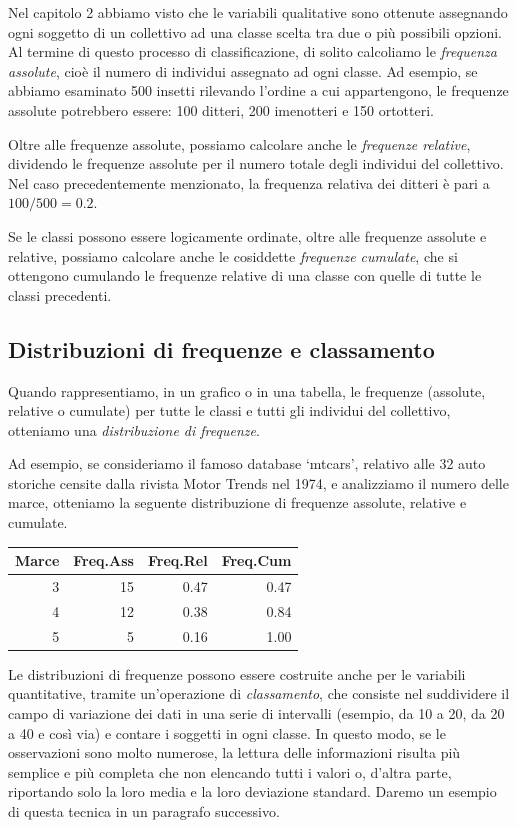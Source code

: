\documentclass[a4paper,12pt,oneside]{book}
\begin{document}
Nel capitolo 2 abbiamo visto che le variabili qualitative sono ottenute assegnando ogni soggetto di un collettivo ad una classe scelta tra due o più possibili opzioni. Al termine di questo processo di classificazione, di solito calcoliamo le \emph{frequenza assolute}, cioè il numero di individui assegnato ad ogni classe. Ad esempio, se abbiamo esaminato 500 insetti rilevando l'ordine a cui appartengono, le frequenze assolute potrebbero essere: 100 ditteri, 200 imenotteri e 150 ortotteri.

Oltre alle frequenze assolute, possiamo calcolare anche le \emph{frequenze relative}, dividendo le frequenze assolute per il numero totale degli individui del collettivo. Nel caso precedentemente menzionato, la frequenza relativa dei ditteri è pari a \(100/500 = 0.2\).

Se le classi possono essere logicamente ordinate, oltre alle frequenze assolute e relative, possiamo calcolare anche le cosiddette \emph{frequenze cumulate}, che si ottengono cumulando le frequenze relative di una classe con quelle di tutte le classi precedenti.

\hypertarget{distribuzioni-di-frequenze-e-classamento}{%
\subsection{Distribuzioni di frequenze e classamento}\label{distribuzioni-di-frequenze-e-classamento}}

Quando rappresentiamo, in un grafico o in una tabella, le frequenze (assolute, relative o cumulate) per tutte le classi e tutti gli individui del collettivo, otteniamo una \emph{distribuzione di frequenze}.

Ad esempio, se consideriamo il famoso database `mtcars', relativo alle 32 auto storiche censite dalla rivista Motor Trends nel 1974, e analizziamo il numero delle marce, otteniamo la seguente distribuzione di frequenze assolute, relative e cumulate.

\begin{tabular}{r|r|r|r}
\hline
Marce & Freq.Ass & Freq.Rel & Freq.Cum\\
\hline
3 & 15 & 0.47 & 0.47\\
\hline
4 & 12 & 0.38 & 0.84\\
\hline
5 & 5 & 0.16 & 1.00\\
\hline
\end{tabular}

Le distribuzioni di frequenze possono essere costruite anche per le variabili quantitative, tramite un'operazione di \emph{classamento}, che consiste nel suddividere il campo di variazione dei dati in una serie di intervalli (esempio, da 10 a 20, da 20 a 40 e così via) e contare i soggetti in ogni classe. In questo modo, se le osservazioni sono molto numerose, la lettura delle informazioni risulta più semplice e più completa che non elencando tutti i valori o, d'altra parte, riportando solo la loro media e la loro deviazione standard. Daremo un esempio di questa tecnica in un paragrafo successivo.
\end{document}
